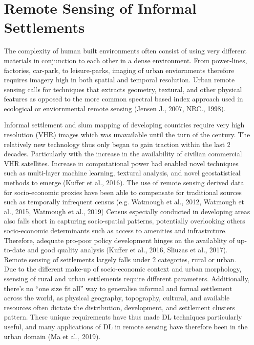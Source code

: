 \documentclass[11pt, a4paper, twoside]{report}
\begin{document}
\section{Remote Sensing of Informal Settlements}\label{RSofInformalSettlement}

The complexity of human built environments often consist of using very different materials in conjunction to each other in a dense environment. From power-lines, factories, car-park, to leisure-parks, imaging of urban enviornments therefore requires imagery high in both spatial and temporal resolution. Urban remote sensing calls for techniques that extracts geometry, textural, and other physical features as opposed to the more common spectral based index approach used in ecological or enviornmental remote sensing (Jensen J., 2007, NRC., 1998).\\\par

Informal settlement and slum mapping of developing countries require very high resolution (VHR) images which was unavailable until the turn of the century. The relatively new technology thus only began to gain traction within the last 2 decades. Particularly with the increase in the availability of civilian commercial VHR satellites. Increase in computational power had enabled novel techniques such as multi-layer machine learning, textural analysis, and novel geostatistical methods to emerge (Kuffer et al., 2016). The use of remote sensing derived data for socio-economic proxies have been able to compensate for traditional sources such as temporally infrequent census (e.g. Watmough et al., 2012, Watmough et al., 2015, Watmough et al., 2019) Census especially conducted in developing areas also falls short in capturing socio-spatial patterns, potentially overlooking others socio-economic determinants such as access to amenities and infrastrcture. Therefore, adequate pro-poor policy development hinges on the availablity of up-to-date and good quality analysis (Kuffer et al., 2016, Sliuzas et al., 2017). Remote sensing of settlements largely falls under 2 categories, rural or urban. Due to the different make-up of socio-economic context and urban morphology, ssensing of rural and urban settlements require different parameters. Additionally, there’s no “one size fit all” way to generalise informal and formal settlement across the world, as physical geography, topography, cultural, and available resources often dictate the distribution, development, and settlement clusters pattern. These unique requirements have thus made DL techniques particularly useful, and many applications of DL in remote sensing have therefore been in the urban domain (Ma et al., 2019).
\end{document}
